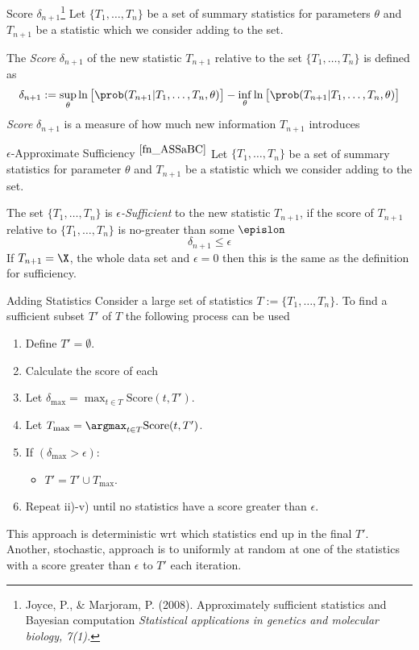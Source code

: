 \documentclass[11pt,a4paper]{article}
\begin{document}
  \begin{definition}{Score $\delta_{n+1}$\footnote{\label{fn_ASSaBC}Joyce, P., \& Marjoram, P. (2008). Approximately sufficient statistics and Bayesian computation \textit{Statistical applications in genetics and molecular biology, 7(1).}}}
    Let $\{T_1,\dots,T_n\}$ be a set of summary statistics for parameters $\theta$ and $T_{n+1}$ be a statistic which we consider adding to the set.
    \par The \textit{Score} $\delta_{n+1}$ of the new statistic $T_{n+1}$ relative to the set $\{T_1,\dots,T_n\}$ is defined as
    \[ \delta_{n+1}:=\sup_\theta\ln\big[\prob(T_{n+1}|T_1,\dots,T_n,\theta)\big]-\inf_\theta\ln\big[\prob(T_{n+1}|T_1,\dots,T_n,\theta)\big] \]
    \textit{Score} $\delta_{n+1}$ is a measure of how much new information $T_{n+1}$ introduces
  \end{definition}

  \begin{definition}{$\epsilon$-Approximate Sufficiency \textsuperscript{$\ref{fn_ASSaBC}$}}
    Let $\{T_1,\dots,T_n\}$ be a set of summary statistics for parameter $\theta$ and $T_{n+1}$ be a statistic which we consider adding to the set.
    \par The set $\{T_1,\dots,T_n\}$ is \textit{$\epsilon$-Sufficient} to the new statistic $T_{n+1}$, if the score of $T_{n+1}$ relative to $\{T_1,\dots,T_n\}$ is no-greater than some $\epislon$
    \[ \delta_{n+1}\leq\epsilon \]
    If $T_{n+1}=\X$, the whole data set and $\epsilon=0$ then this is the same as the definition for sufficiency.
  \end{definition}

  \begin{remark}{Adding Statistics}
    Consider a large set of statistics $T:=\{T_1,\dots,T_n\}$. To find a sufficient subset $T'$ of $T$ the following process can be used
    \begin{enumerate}
      \item Define $T'=\emptyset$.
      \item Calculate the score of each
      \item Let $\delta_\text{max}=\max_{t\in T}\text{Score}(t,T')$.
      \item Let $T_\text{max}=\argmax_{t\in T}\text{Score}(t,T')$.
      \item If $(\delta_\text{max}>\epsilon)$:
      \begin{itemize}
        \item $T'=T'\cup T_\text{max}$.
      \end{itemize}
      \item Repeat ii)-v) until no statistics have a score greater than $\epsilon$.
    \end{enumerate}
    This approach is deterministic wrt which statistics end up in the final $T'$. Another, stochastic, approach is to uniformly at random at one of the statistics with a score greater than $\epsilon$ to $T'$ each iteration.
  \end{remark}
\end{document}

